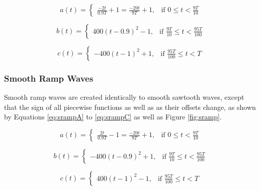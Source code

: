 \documentclass[12pt,twoside]{report}
\begin{document}
\begin{equation}
  a(t) =
  \begin{cases}
    \frac{-2t}{0.9T} + 1 = \frac{-20t}{9T} + 1,& \text{if } 0 \leq t < \frac{9T}{10}
  \end{cases}
  \label{eq:ssawA}
\end{equation}

\begin{equation}
  b(t) =
  \begin{cases}
    400(t-0.9)^2 - 1,& \text{if } \frac{9T}{10} \leq t < \frac{95T}{100}
  \end{cases}
  \label{eq:ssawB}
\end{equation}

\begin{equation}
  c(t) =
  \begin{cases}
    -400(t-1)^2 + 1,& \text{if } \frac{95T}{100} \leq t < T
  \end{cases}
  \label{eq:ssawC}
\end{equation}

\subsubsection{Smooth Ramp Waves}

Smooth ramp waves are created identically to smooth sawtooth waves, except that the sign of all piecewise functions as well as as their offsets change, as shown by Equations \ref{eq:srampA} to \ref{eq:srampC} as well as Figure \ref{fig:sramp}.

\begin{equation}
  a(t) =
  \begin{cases}
    \frac{2t}{0.9T} - 1 = \frac{-20t}{9T} + 1,& \text{if } 0 \leq t < \frac{9T}{10}
  \end{cases}
  \label{eq:srampA}
\end{equation}

\begin{equation}
  b(t) =
  \begin{cases}
    -400(t-0.9)^2 + 1,& \text{if } \frac{9T}{10} \leq t < \frac{95T}{100}
  \end{cases}
  \label{eq:srampB}
\end{equation}

\begin{equation}
  c(t) =
  \begin{cases}
    400(t-1)^2 - 1,& \text{if } \frac{95T}{100} \leq t < T
  \end{cases}
  \label{eq:srampC}
\end{equation}
\end{document}
